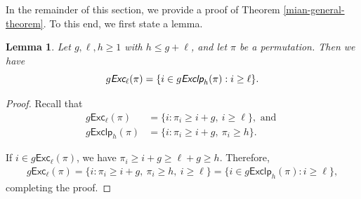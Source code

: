 \documentclass[12pt]{article}
\newtheorem{lemma}{Lemma}[section]
\begin{document}
In the remainder of this section,  
we provide a proof of Theorem \ref{mian-general-theorem}.
To this end, we first state a lemma.
\begin{lemma}\label{Lemma_Exc_Exclp}
Let $g,\ell,h\geq1$ with $h\leq g+\ell$, and let $\pi$ be a permutation.
Then we have
$$g\emph{\textsf{Exc}}_{\ell}(\pi)=\{i\in g\emph{\textsf{Exclp}}_{h}(\pi):i\geq \ell\}.$$
\end{lemma}	
\begin{proof}
		Recall that
\vspace{-6pt}
	\begin{align*}
		g\textsf{Exc}_{\ell}(\pi)&=\{i:\pi_{i}\geq i+g,\!~i\geq \ell\},\text{~and~}\\
		g\textsf{Exclp}_{h}(\pi)&=\{i:\pi_{i}\geq i+g,\!~\pi_{i}\geq h\}.
	\end{align*}

\vspace{-10pt}
\noindent  If $i\in g\textsf{Exc}_{\ell}(\pi)$, we have $\pi_{i}\geq i+g\geq \ell+g\geq h$. 
Therefore, 
\begin{align*} 
	g\textsf{Exc}_{\ell}(\pi)=\{i:\pi_{i}\geq i+g,\!~\pi_{i}\geq h,\!~i\geq \ell\}=\{i\in g\textsf{Exclp}_{h}(\pi):i\geq \ell\},
\end{align*}	
completing the proof.
\end{proof}
\end{document}
